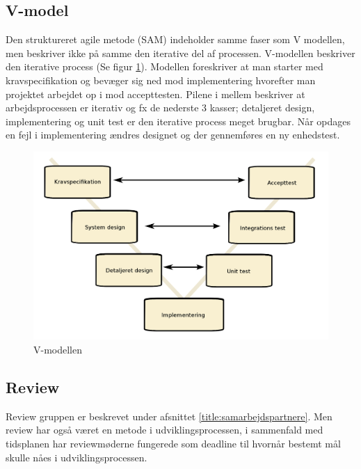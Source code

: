 \subsection{V-model}
Den struktureret agile metode (SAM) indeholder samme faser som V modellen, men beskriver ikke på samme den iterative del af processen. V-modellen beskriver den iterative process (Se figur \ref{fig:vmodel}). Modellen foreskriver at man starter med kravspecifikation og bevæger sig ned mod implementering hvorefter man projektet arbejdet op i mod accepttesten. Pilene i mellem beskriver at arbejdsprocessen er iterativ og fx de nederste 3 kasser; detaljeret design, implementering og unit test er den iterative process meget brugbar. Når opdages en fejl i implementering ændres designet og der gennemføres en ny enhedstest.  
\begin{figure}[H]
	\includegraphics[width = \textwidth]{billeder/vmodel.png}
	\caption{V-modellen}\label{fig:vmodel}
\end{figure}

\subsection{Review}
Review gruppen er beskrevet under afsnittet \ref{title:samarbejdspartnere}. Men review har også været en metode i udviklingsprocessen, i sammenfald med tidsplanen har reviewmøderne fungerede som deadline til hvornår bestemt mål skulle nåes i udviklingsprocessen. 
